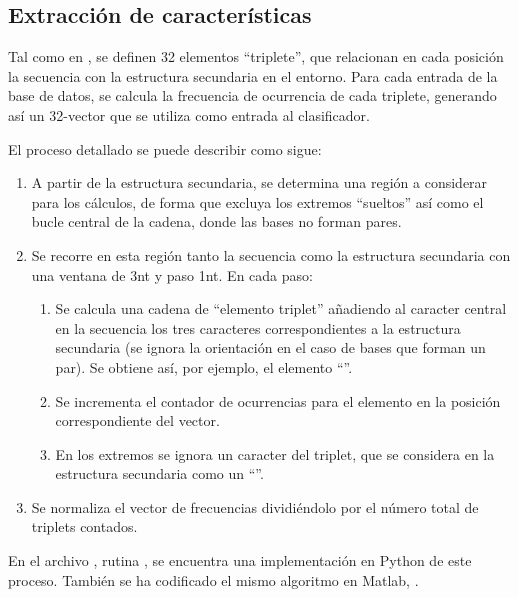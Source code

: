 \documentclass[12pt,bibliography=oldstyle,DIV=12,parskip=half-,titlepage]{scrartcl}
\begin{document}
\subsection{Extracción de características}
%
Tal como en \cite{xue}, se definen 32 elementos ``triplete'', que
relacionan en cada posición la secuencia con la estructura secundaria
en el entorno. Para cada entrada de la base de datos, se calcula la
frecuencia de ocurrencia de cada triplete, generando así un 32-vector
que se utiliza como entrada al clasificador.


El proceso detallado se puede describir como sigue:
\begin{enumerate}
\item A partir de la estructura secundaria, se determina una región a
  considerar para los cálculos, de forma que excluya los extremos
  ``sueltos'' así como el bucle central de la cadena, donde las bases
  no forman pares.
\item Se recorre en esta región tanto la secuencia como la
  estructura secundaria con una ventana de 3nt y paso 1nt. En cada
  paso:
  \begin{enumerate}
  \item Se calcula una cadena de ``elemento triplet'' añadiendo al
    caracter central en la secuencia los tres caracteres
    correspondientes a la estructura secundaria (se ignora la
    orientación en el caso de bases que forman un par). Se obtiene
    así, por ejemplo, el elemento ``''.
  \item Se incrementa el contador de ocurrencias para el elemento en
    la posición correspondiente del vector.
  \item En los extremos se ignora un caracter del triplet, que se
    considera en la estructura secundaria como un ``''.
  \end{enumerate}
\item Se normaliza el vector de frecuencias dividiéndolo por el número
  total de triplets contados.
\end{enumerate}

En el archivo , rutina , se encuentra
una implementación en Python de este proceso. También se ha codificado
el mismo algoritmo en Matlab, .
%
\end{document}
